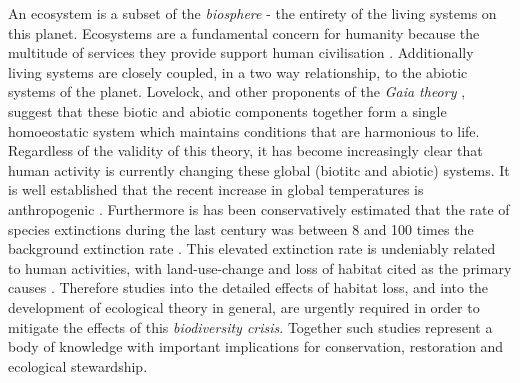 An ecosystem is a subset of the \emph{biosphere} - the entirety of the living systems on this planet. Ecosystems are a fundamental concern for humanity because the multitude of services they provide support human civilisation  \cite{assessment2005ecosystems}. Additionally living systems are closely coupled, in a two way relationship, to the abiotic systems of the planet. Lovelock, and other proponents of the \emph{Gaia theory} \cite{lovelock1974atmospheric}, suggest that these biotic and abiotic components together form a single homoeostatic system which maintains conditions that are harmonious to life. Regardless of the validity of this theory, it has become increasingly clear that human activity is currently changing these global (biotitc and abiotic) systems. It is well established that the recent increase in global temperatures is anthropogenic \cite{pachauri2015synthesis,staudt2007understanding}. Furthermore is has been conservatively estimated that the rate of species extinctions during the last century was between 8 and 100 times the background extinction rate \cite{ceballos2015accelerated}. This elevated extinction rate is undeniably related to human activities, with land-use-change and loss of habitat cited as the primary causes \cite{foley2005global,newbold2015global}. Therefore studies into the detailed effects of habitat loss, and into the development of ecological theory in general, are urgently required in order to mitigate the effects of this \emph{biodiversity crisis}. Together such studies represent a body of knowledge with important implications for conservation, restoration and ecological stewardship.




